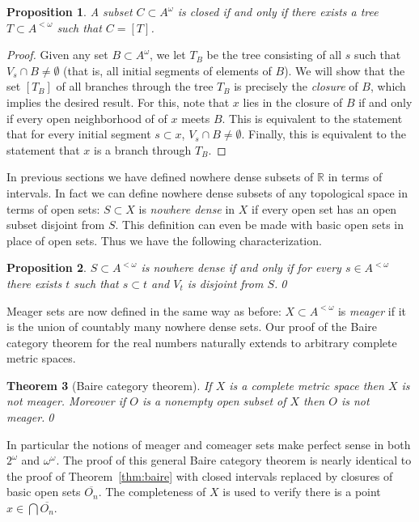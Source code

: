 \documentclass[11pt,oneside]{amsbook}
\newcommand{\RR}{\mathbb R}
\theoremstyle{definition}
\theoremstyle{plain}
\newtheorem{thm}{Theorem}[section]
\newtheorem{prop}[thm]{Proposition}
\theoremstyle{definition}
\theoremstyle{remark}
\begin{document}
\begin{prop}
  A subset $C\subset A^\omega$ is closed if and only if there exists a tree $T\subset A^{<\omega}$ such that $C=[T]$.
\end{prop}

\begin{proof}
  Given any set $B\subset A^\omega$, we let $T_B$ be the tree consisting of all $s$ such that $V_s\cap B\neq\emptyset$ (that is, all initial segments of elements of $B$). We will show that the set $[T_B]$ of all branches through the tree $T_B$ is precisely the \emph{closure} of $B$, which implies the desired result. For this, note that $x$ lies in the closure of $B$ if and only if every open neighborhood of of $x$ meets $B$. This is equivalent to the statement that for every initial segment $s\subset x$, $V_s\cap B\neq\emptyset$. Finally, this is equivalent to the statement that $x$ is a branch through $T_B$.
\end{proof}

In previous sections we have defined nowhere dense subsets of $\RR$ in terms of intervals. In fact we can define nowhere dense subsets of any topological space in terms of open sets: $S\subset X$ is \emph{nowhere dense} in $X$ if every open set has an open subset disjoint from $S$. This definition can even be made with basic open sets in place of open sets. Thus we have the following characterization.

\begin{prop}
  \label{prop:cantor-space-nwd}
  $S\subset A^{<\omega}$ is nowhere dense if and only if for every $s\in A^{<\omega}$ there exists $t$ such that $s\subset t$ and $V_t$ is disjoint from $S$.\qed
\end{prop}

Meager sets are now defined in the same way as before: $X\subset A^{<\omega}$ is \emph{meager} if it is the union of countably many nowhere dense sets. Our proof of the Baire category theorem for the real numbers naturally extends to arbitrary complete metric spaces.

\begin{thm}[Baire category theorem]
  If $X$ is a complete metric space then $X$ is not meager. Moreover if $O$ is a nonempty open subset of $X$ then $O$ is not meager.\qed
\end{thm}

In particular the notions of meager and comeager sets make perfect sense in both $2^\omega$ and $\omega^\omega$. The proof of this general Baire category theorem is nearly identical to the proof of Theorem~\ref{thm:baire} with closed intervals replaced by closures of basic open sets $\overline{O_n}$. The completeness of $X$ is used to verify there is a point $x\in\bigcap\overline{O_n}$.
\end{document}
